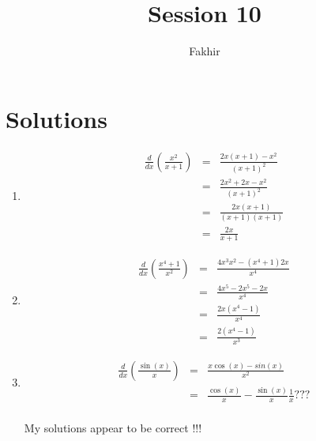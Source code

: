 \documentclass[]{article}
\title{Session 10}
\author{Fakhir}
\begin{document}
\maketitle

\section*{Solutions}

\begin{enumerate}
	\item 
	\begin{eqnarray}
	\frac{d}{dx} \left( \frac{x^{2}}{x+1} \right) & = & \frac{2x(x+1)-x^{2}}{(x+1)^{2}} \\
	        & = & \frac{2x^{2}+2x-x^{2}}{(x+1)^{2}} \\
	        & = & \frac{2x\left(x+1\right)}{(x+1)(x+1)} \\
	        & = & \frac{2x}{x+1}
	\end{eqnarray}
	
	\item 
	\begin{eqnarray}
	\frac{d}{dx} \left( \frac{x^{4}+1}{x^{2}} \right) & = & \frac{4x^{3}x^{2}-\left(x^{4}+1\right)2x}{x^{4}} \\
			& = & \frac{4x^{5}-2x^{5}-2x}{x^{4}} \\
			& = & \frac{2x\left(x^{4}-1\right)}{x^{4}} \\
			& = & \frac{2\left(x^{4}-1\right)}{x^{3}}
	\end{eqnarray}
	
	\item 
	\begin{eqnarray}
	\frac{d}{dx} \left( \frac{\sin(x)}{x} \right) & = & \frac{x\cos(x)-sin(x)}{x^{2}} \\
			& = & \frac{\cos(x)}{x} - \frac{\sin(x)}{x}\frac{1}{x} ??? \\
	\end{eqnarray}
	
	My solutions appear to be correct !!!
	
\end{enumerate}
\end{document}
